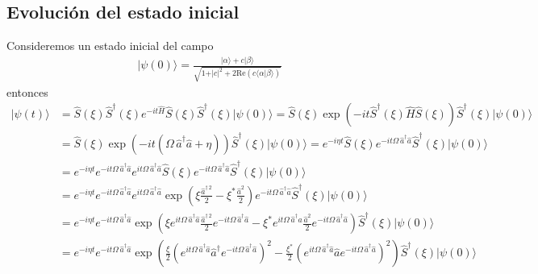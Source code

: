 \subsection{Evolución del estado inicial}
Consideremos un estado inicial del campo
\begin{align*}
	\vert \psi(0)\rangle = \frac{\vert \alpha \rangle + c \vert \beta\rangle}{\sqrt{1+\vert c\vert^{2} + 2 \mathrm{Re}\left(c\langle \alpha \vert \beta \rangle \right)}}
\end{align*}
entonces
\begin{align*}
	\vert \psi(t) \rangle & = \hat{S}(\xi)\hat{S}^{\dagger}(\xi) e^{-it \hat{H}} \hat{S}(\xi)\hat{S}^{\dagger}(\xi)\vert \psi(0)\rangle = \hat{S}(\xi)\exp\left(-it \hat{S}^{\dagger}(\xi)\hat{H}\hat{S}(\xi)\right) \hat{S}^{\dagger}(\xi)\vert \psi(0)\rangle                                                                                                                                                     \\
	                      & = \hat{S}(\xi)\exp\left(-it \left(\Omega \,\hat{a}^{\dagger}\hat{a} + \eta\right)\right) \hat{S}^{\dagger}(\xi)\vert \psi(0)\rangle = e^{-i\eta t} \hat{S}(\xi)e^{-it \Omega \,\hat{a}^{\dagger}\hat{a}} \hat{S}^{\dagger}(\xi)\vert \psi(0)\rangle                                                                                                                                     \\
	                      & = e^{-i\eta t}e^{-it \Omega \,\hat{a}^{\dagger}\hat{a}} e^{it \Omega \,\hat{a}^{\dagger}\hat{a}} \hat{S}(\xi) e^{-it \Omega \,\hat{a}^{\dagger}\hat{a}} \hat{S}^{\dagger}(\xi)\vert \psi(0)\rangle                                                                                                                                                                                      \\
	                      & = e^{-i\eta t}e^{-it \Omega \,\hat{a}^{\dagger}\hat{a}} e^{it \Omega \,\hat{a}^{\dagger}\hat{a}} \exp\left(\xi \frac{\hat{a}^{\dagger\,2}}{2} - \xi^{*} \frac{\hat{a}^{2}}{2}\right) e^{-it \Omega \,\hat{a}^{\dagger}\hat{a}} \hat{S}^{\dagger}(\xi)\vert \psi(0)\rangle                                                                                                               \\
	                      & = e^{-i\eta t} e^{-it \Omega \,\hat{a}^{\dagger}\hat{a}}  \exp\left(\xi e^{it \Omega \,\hat{a}^{\dagger}\hat{a}}\frac{\hat{a}^{\dagger\,2}}{2}e^{-it \Omega \,\hat{a}^{\dagger}\hat{a}} - \xi^{*} e^{it \Omega \,\hat{a}^{\dagger}\hat{a}} \frac{\hat{a}^{2}}{2} e^{-it \Omega \,\hat{a}^{\dagger}\hat{a}}\right)  \hat{S}^{\dagger}(\xi)\vert \psi(0)\rangle                           \\
	                      & = e^{-i\eta t} e^{-it \Omega \,\hat{a}^{\dagger}\hat{a}}  \exp\left(\frac{\xi}{2}\left(e^{it \Omega \,\hat{a}^{\dagger}\hat{a}}\hat{a}^{\dagger}e^{-it \Omega \,\hat{a}^{\dagger}\hat{a}}\right)^{2} - \frac{\xi^{*}}{2}\left(e^{it \Omega \,\hat{a}^{\dagger}\hat{a}} \hat{a} e^{-it \Omega \,\hat{a}^{\dagger}\hat{a}}\right)^{2} \right)  \hat{S}^{\dagger}(\xi)\vert \psi(0)\rangle \\
\end{align*}
